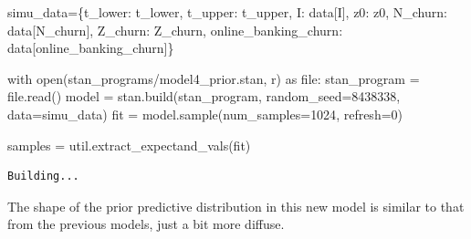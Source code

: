 \documentclass[
  letterpaper,
  DIV=11,
  numbers=noendperiod]{scrartcl}
\newenvironment{Shaded}{\begin{snugshade}}{\end{snugshade}}
\newcommand{\BuiltInTok}[1]{\textcolor[rgb]{0.00,0.23,0.31}{#1}}
\newcommand{\ControlFlowTok}[1]{\textcolor[rgb]{0.00,0.23,0.31}{#1}}
\newcommand{\DecValTok}[1]{\textcolor[rgb]{0.68,0.00,0.00}{#1}}
\newcommand{\ImportTok}[1]{\textcolor[rgb]{0.00,0.46,0.62}{#1}}
\newcommand{\NormalTok}[1]{\textcolor[rgb]{0.00,0.23,0.31}{#1}}
\newcommand{\OperatorTok}[1]{\textcolor[rgb]{0.37,0.37,0.37}{#1}}
\newcommand{\StringTok}[1]{\textcolor[rgb]{0.13,0.47,0.30}{#1}}
\begin{document}
\begin{Shaded}
\begin{Highlighting}[]
\NormalTok{simu\_data}\OperatorTok{=}\NormalTok{\{}\StringTok{\textquotesingle{}t\_lower\textquotesingle{}}\NormalTok{: t\_lower, }\StringTok{\textquotesingle{}t\_upper\textquotesingle{}}\NormalTok{: t\_upper,}
           \StringTok{\textquotesingle{}I\textquotesingle{}}\NormalTok{: data[}\StringTok{\textquotesingle{}I\textquotesingle{}}\NormalTok{], }\StringTok{\textquotesingle{}z0\textquotesingle{}}\NormalTok{: z0,}
           \StringTok{\textquotesingle{}N\_churn\textquotesingle{}}\NormalTok{: data[}\StringTok{\textquotesingle{}N\_churn\textquotesingle{}}\NormalTok{], }\StringTok{\textquotesingle{}Z\_churn\textquotesingle{}}\NormalTok{: Z\_churn,}
           \StringTok{\textquotesingle{}online\_banking\_churn\textquotesingle{}}\NormalTok{: data[}\StringTok{\textquotesingle{}online\_banking\_churn\textquotesingle{}}\NormalTok{]\}}

\ControlFlowTok{with} \BuiltInTok{open}\NormalTok{(}\StringTok{\textquotesingle{}stan\_programs/model4\_prior.stan\textquotesingle{}}\NormalTok{, }\StringTok{\textquotesingle{}r\textquotesingle{}}\NormalTok{) }\ImportTok{as} \BuiltInTok{file}\NormalTok{:}
\NormalTok{  stan\_program }\OperatorTok{=} \BuiltInTok{file}\NormalTok{.read()}
\NormalTok{model }\OperatorTok{=}\NormalTok{ stan.build(stan\_program,}
\NormalTok{                   random\_seed}\OperatorTok{=}\DecValTok{8438338}\NormalTok{,}
\NormalTok{                   data}\OperatorTok{=}\NormalTok{simu\_data)}
\NormalTok{fit }\OperatorTok{=}\NormalTok{ model.sample(num\_samples}\OperatorTok{=}\DecValTok{1024}\NormalTok{, refresh}\OperatorTok{=}\DecValTok{0}\NormalTok{)}

\NormalTok{samples }\OperatorTok{=}\NormalTok{ util.extract\_expectand\_vals(fit)}
\end{Highlighting}
\end{Shaded}

\begin{verbatim}
Building...
\end{verbatim}

The shape of the prior predictive distribution in this new model is
similar to that from the previous models, just a bit more diffuse.
\end{document}

